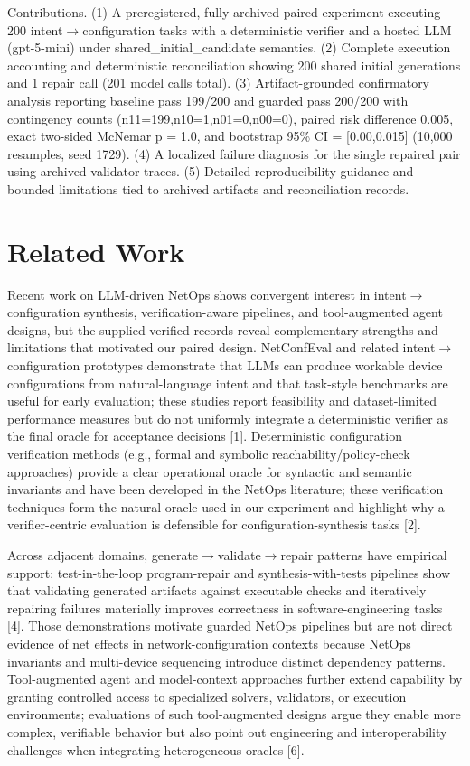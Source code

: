 \documentclass[conference]{IEEEtran}
\begin{document}
Contributions. (1) A preregistered, fully archived paired experiment executing 200 intent\ensuremath{\rightarrow}configuration tasks with a deterministic verifier and a hosted LLM (gpt-5-mini) under shared\_initial\_candidate semantics. (2) Complete execution accounting and deterministic reconciliation showing 200 shared initial generations and 1 repair call (201 model calls total). (3) Artifact-grounded confirmatory analysis reporting baseline pass 199/200 and guarded pass 200/200 with contingency counts (n11=199,n10=1,n01=0,n00=0), paired risk difference 0.005, exact two-sided McNemar p = 1.0, and bootstrap 95\% CI = [0.00,0.015] (10,000 resamples, seed 1729). (4) A localized failure diagnosis for the single repaired pair using archived validator traces. (5) Detailed reproducibility guidance and bounded limitations tied to archived artifacts and reconciliation records.

\section{Related Work}
Recent work on LLM-driven NetOps shows convergent interest in intent\ensuremath{\rightarrow}configuration synthesis, verification-aware pipelines, and tool-augmented agent designs, but the supplied verified records reveal complementary strengths and limitations that motivated our paired design. NetConfEval and related intent\ensuremath{\rightarrow}configuration prototypes demonstrate that LLMs can produce workable device configurations from natural-language intent and that task-style benchmarks are useful for early evaluation; these studies report feasibility and dataset-limited performance measures but do not uniformly integrate a deterministic verifier as the final oracle for acceptance decisions [1]. Deterministic configuration verification methods (e.g., formal and symbolic reachability/policy-check approaches) provide a clear operational oracle for syntactic and semantic invariants and have been developed in the NetOps literature; these verification techniques form the natural oracle used in our experiment and highlight why a verifier-centric evaluation is defensible for configuration-synthesis tasks [2].

Across adjacent domains, generate\ensuremath{\rightarrow}validate\ensuremath{\rightarrow}repair patterns have empirical support: test-in-the-loop program-repair and synthesis-with-tests pipelines show that validating generated artifacts against executable checks and iteratively repairing failures materially improves correctness in software-engineering tasks [4]. Those demonstrations motivate guarded NetOps pipelines but are not direct evidence of net effects in network-configuration contexts because NetOps invariants and multi-device sequencing introduce distinct dependency patterns. Tool-augmented agent and model-context approaches further extend capability by granting controlled access to specialized solvers, validators, or execution environments; evaluations of such tool-augmented designs argue they enable more complex, verifiable behavior but also point out engineering and interoperability challenges when integrating heterogeneous oracles [6].
\end{document}

